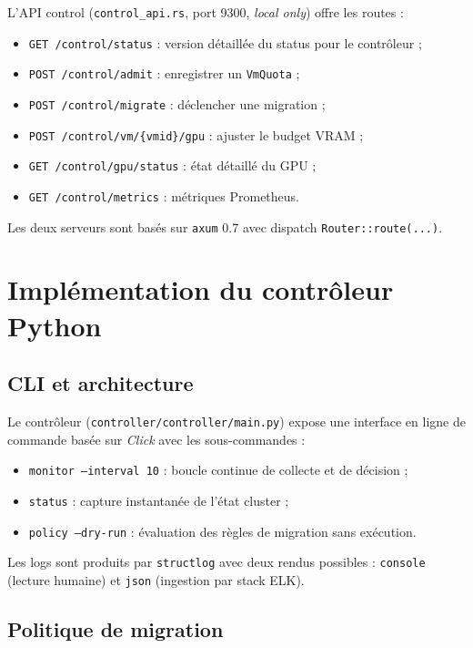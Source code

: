 L'API control (\texttt{control\_api.rs}, port 9300, \emph{local only}) offre les routes :
\begin{itemize}[leftmargin=*]
    \item \texttt{GET /control/status} : version détaillée du status pour le contrôleur ;
    \item \texttt{POST /control/admit} : enregistrer un \texttt{VmQuota} ;
    \item \texttt{POST /control/migrate} : déclencher une migration ;
    \item \texttt{POST /control/vm/\{vmid\}/gpu} : ajuster le budget VRAM ;
    \item \texttt{GET /control/gpu/status} : état détaillé du GPU ;
    \item \texttt{GET /control/metrics} : métriques Prometheus.
\end{itemize}
Les deux serveurs sont basés sur \texttt{axum} 0.7 avec dispatch \texttt{Router::route(...)}.

\section{Implémentation du contrôleur Python}
\label{sec:impl-controller}

\subsection{CLI et architecture}

Le contrôleur (\texttt{controller/controller/main.py}) expose une interface en ligne de commande basée sur \emph{Click} avec les sous-commandes :
\begin{itemize}[leftmargin=*]
    \item \texttt{monitor --interval 10} : boucle continue de collecte et de décision ;
    \item \texttt{status} : capture instantanée de l'état cluster ;
    \item \texttt{policy --dry-run} : évaluation des règles de migration sans exécution.
\end{itemize}
Les logs sont produits par \texttt{structlog} avec deux rendus possibles : \texttt{console} (lecture humaine) et \texttt{json} (ingestion par stack ELK).

\subsection{Politique de migration}

